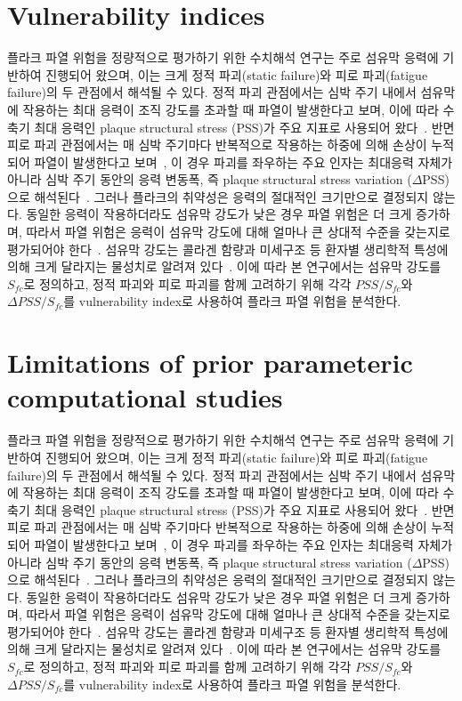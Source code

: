 \documentclass[master,english,final]{kaist-ucs}
\begin{document}
\section{Vulnerability indices}
플라크 파열 위험을 정량적으로 평가하기 위한 수치해석 연구는 주로 섬유막 응력에 기반하여 진행되어 왔으며, 이는 크게 정적 파괴(static failure)와 피로 파괴(fatigue failure)의 두 관점에서 해석될 수 있다. 정적 파괴 관점에서는 심박 주기 내에서 섬유막에 작용하는 최대 응력이 조직 강도를 초과할 때 파열이 발생한다고 보며, 이에 따라 수축기 최대 응력인 plaque structural stress (PSS)가 주요 지표로 사용되어 왔다~\cite{teng_pss, huang_pss}. 반면 피로 파괴 관점에서는 매 심박 주기마다 반복적으로 작용하는 하중에 의해 손상이 누적되어 파열이 발생한다고 보며~\cite{bank_fatigue_hypothesis, versluis_paris_fatigue}, 이 경우 파괴를 좌우하는 주요 인자는 최대응력 자체가 아니라 심박 주기 동안의 응력 변동폭, 즉 plaque structural stress variation ($\Delta$PSS)으로 해석된다~\cite{fatigue, costopoulos_vh_ivus}.
그러나 플라크의 취약성은 응력의 절대적인 크기만으로 결정되지 않는다. 동일한 응력이 작용하더라도 섬유막 강도가 낮은 경우 파열 위험은 더 크게 증가하며, 따라서 파열 위험은 응력이 섬유막 강도에 대해 얼마나 큰 상대적 수준을 갖는지로 평가되어야 한다~\cite{corti_vi}. 섬유막 강도는 콜라겐 함량과 미세구조 등 환자별 생리학적 특성에 의해 크게 달라지는 물성치로 알려져 있다~\cite{savvopoulos_collagen_modulus, chai_indentation}. 이에 따라 본 연구에서는 섬유막 강도를 $S_{fc}$로 정의하고, 정적 파괴와 피로 파괴를 함께 고려하기 위해 각각 $PSS/S_{fc}$와 $\Delta PSS/S_{fc}$를 vulnerability index로 사용하여 플라크 파열 위험을 분석한다.

\section{Limitations of prior parameteric computational studies}
플라크 파열 위험을 정량적으로 평가하기 위한 수치해석 연구는 주로 섬유막 응력에 기반하여 진행되어 왔으며, 이는 크게 정적 파괴(static failure)와 피로 파괴(fatigue failure)의 두 관점에서 해석될 수 있다. 정적 파괴 관점에서는 심박 주기 내에서 섬유막에 작용하는 최대 응력이 조직 강도를 초과할 때 파열이 발생한다고 보며, 이에 따라 수축기 최대 응력인 plaque structural stress (PSS)가 주요 지표로 사용되어 왔다~\cite{teng_pss, huang_pss}. 반면 피로 파괴 관점에서는 매 심박 주기마다 반복적으로 작용하는 하중에 의해 손상이 누적되어 파열이 발생한다고 보며~\cite{bank_fatigue_hypothesis, versluis_paris_fatigue}, 이 경우 파괴를 좌우하는 주요 인자는 최대응력 자체가 아니라 심박 주기 동안의 응력 변동폭, 즉 plaque structural stress variation ($\Delta$PSS)으로 해석된다~\cite{fatigue, costopoulos_vh_ivus}.
그러나 플라크의 취약성은 응력의 절대적인 크기만으로 결정되지 않는다. 동일한 응력이 작용하더라도 섬유막 강도가 낮은 경우 파열 위험은 더 크게 증가하며, 따라서 파열 위험은 응력이 섬유막 강도에 대해 얼마나 큰 상대적 수준을 갖는지로 평가되어야 한다~\cite{corti_vi}. 섬유막 강도는 콜라겐 함량과 미세구조 등 환자별 생리학적 특성에 의해 크게 달라지는 물성치로 알려져 있다~\cite{savvopoulos_collagen_modulus, chai_indentation}. 이에 따라 본 연구에서는 섬유막 강도를 $S_{fc}$로 정의하고, 정적 파괴와 피로 파괴를 함께 고려하기 위해 각각 $PSS/S_{fc}$와 $\Delta PSS/S_{fc}$를 vulnerability index로 사용하여 플라크 파열 위험을 분석한다.
\end{document}
